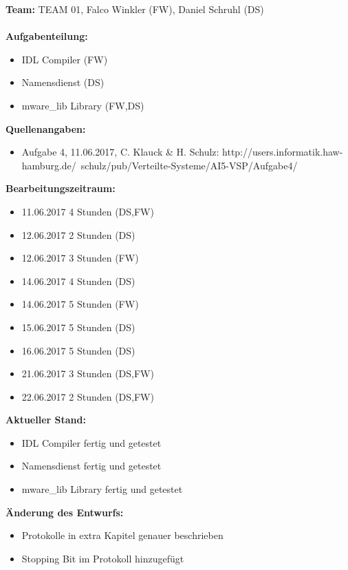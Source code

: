 \documentclass{article}
\begin{document}
\textbf{Team:} TEAM 01, Falco Winkler (FW), Daniel Schruhl (DS)\\
\\
\textbf{Aufgabenteilung:}
\begin{itemize}
    \item IDL Compiler (FW)
    \item Namensdienst (DS)
    \item mware\_lib Library (FW,DS)
\end{itemize}

\textbf{Quellenangaben:}
\begin{itemize}
    \item Aufgabe 4, 11.06.2017, C. Klauck \& H. Schulz: \newline
    http://users.informatik.haw-hamburg.de/~schulz/pub/Verteilte-Systeme/AI5-VSP/Aufgabe4/
\end{itemize}

\textbf{Bearbeitungszeitraum:}
\begin{itemize}
	\item 11.06.2017 4 Stunden (DS,FW)
	\item 12.06.2017 2 Stunden (DS)
	\item 12.06.2017 3 Stunden (FW)
	\item 14.06.2017 4 Stunden (DS)
	\item 14.06.2017 5 Stunden (FW)
	\item 15.06.2017 5 Stunden (DS)
	\item 16.06.2017 5 Stunden (DS)
	\item 21.06.2017 3 Stunden (DS,FW)
	\item 22.06.2017 2 Stunden (DS,FW)
\end{itemize}

\textbf{Aktueller Stand:}
\begin{itemize}
	\item IDL Compiler fertig und getestet
    \item Namensdienst fertig und getestet
    \item mware\_lib Library fertig und getestet
\end{itemize}

\textbf{Änderung des Entwurfs:}
\begin{itemize}
    \item Protokolle in extra Kapitel genauer beschrieben
    \item Stopping Bit im Protokoll hinzugefügt
\end{itemize}

\newpage
\end{document}
